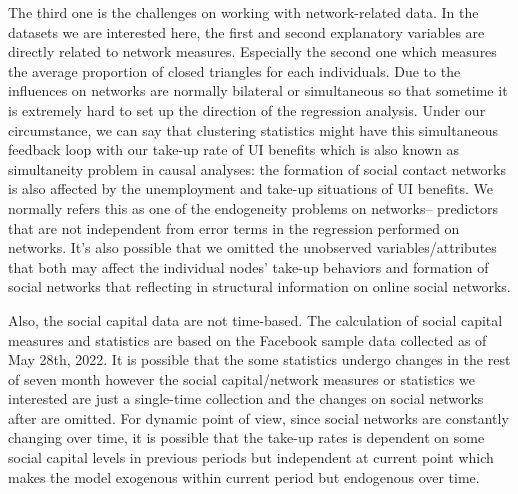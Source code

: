 \documentclass{article}
\begin{document}
The third one is the challenges on working with network-related data. In the datasets we are interested here, the first and second explanatory variables are directly related to network measures. Especially the second one which measures the average proportion of closed triangles for each individuals. Due to the influences on networks are normally bilateral or simultaneous so that sometime it is extremely hard to set up the direction of the regression analysis. Under our circumstance, we can say that clustering statistics might have this simultaneous feedback loop with our take-up rate of UI benefits which is also known as simultaneity problem in causal analyses: the formation of social contact networks is also affected by the unemployment and take-up situations of UI benefits.  We normally refers this as one of the endogeneity problems on networks-- predictors that are not independent from error terms in the regression performed on networks. It's also possible that we omitted the unobserved variables/attributes that both may affect the individual nodes' take-up behaviors and formation of social networks that reflecting in structural information on online social networks.

Also, the social capital data are not time-based. The calculation of social capital measures and statistics are based on the Facebook sample data collected as of May 28th, 2022. It is possible that the some statistics undergo changes in the rest of seven month however the social capital/network measures or statistics we interested are just a single-time collection and the changes on social networks after are omitted. For dynamic point of view, since social networks are constantly changing over time, it is possible that the take-up rates is dependent on some social capital levels in previous periods but independent at current point which makes the model exogenous within current period but endogenous over time. 


\newpage

\printbibliography
\end{document}
